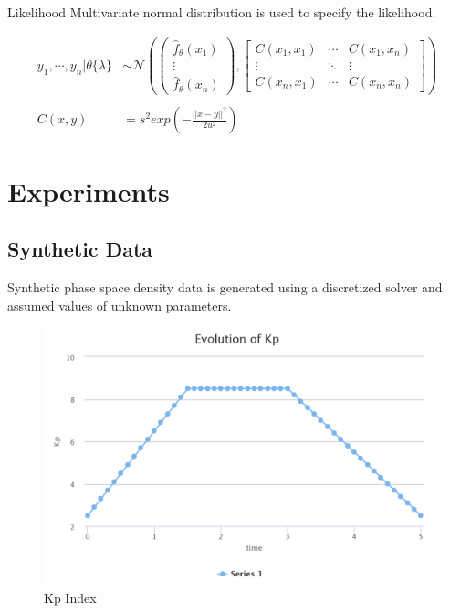 \documentclass{beamer}
\begin{document}
\begin{frame}{Likelihood}
  Multivariate normal distribution is used to specify the likelihood.

  \begin{align*}
    y_{1}, \cdots, y_{n} | \theta\{\lambda\}  &\sim \mathcal{N} \left( \begin{pmatrix}
        \hat{f}_{\theta}(x_{1})\\ 
        \vdots\\ 
        \hat{f}_{\theta}(x_{n})
      \end{pmatrix},  \begin{bmatrix}
        C(x_{1}, x_{1}) & \cdots & C(x_{1}, x_{n})\\ 
        \vdots & \ddots  & \vdots \\ 
        C(x_{n}, x_{1}) & \cdots & C(x_{n}, x_{n}) 
      \end{bmatrix}\right) \\\\
    C(x, y) &= s^{2} exp \left ( -\frac{||x-y||^2}{2u^2} \right )
  \end{align*}
  
\end{frame}

\section{Experiments}
\subsection{Synthetic Data}

\begin{frame}
  Synthetic phase space density data is generated using a discretized
  solver and assumed values of unknown parameters.
\end{frame}

\begin{frame}
  \begin{figure}[h]
  \includegraphics[width=\textwidth]{kp_profile.png}
   \caption{Kp Index}
  \label{fig:Kp}
\end{figure}
\end{frame}
\end{document}
